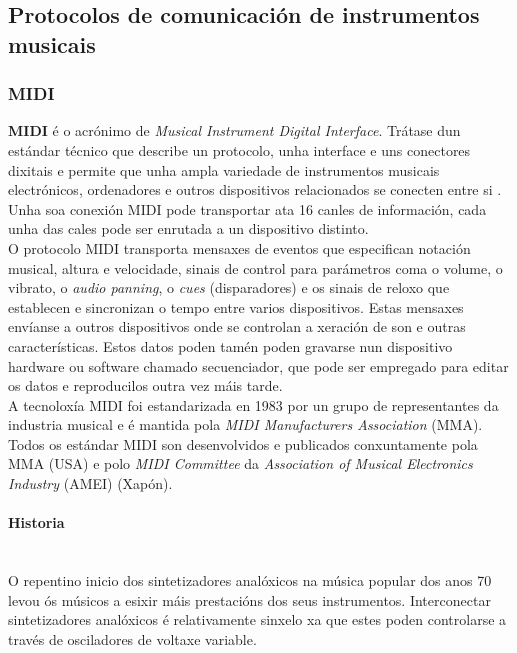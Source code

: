  \subsection{Protocolos de comunicación de instrumentos musicais}

  \subsubsection{MIDI}

  \textbf{MIDI} é o acrónimo de \textit{Musical Instrument Digital Interface}.
  Trátase dun estándar técnico que describe un protocolo, unha interface e uns
  conectores dixitais e permite que unha ampla variedade de instrumentos
  musicais electrónicos, ordenadores e outros dispositivos relacionados se
  conecten entre si \cite{WikipediaMIDI}. \\

  Unha soa conexión MIDI pode transportar ata 16 canles de información, cada
  unha das cales pode ser enrutada a un dispositivo distinto. \\

  O protocolo MIDI transporta mensaxes de eventos que especifican notación
  musical, altura e velocidade, sinais de control para parámetros coma o
  volume, o vibrato, o \textit{audio panning}, o \textit{cues} (disparadores) e
  os sinais de reloxo que establecen e sincronizan o tempo entre varios
  dispositivos. Estas mensaxes envíanse a outros dispositivos onde se controlan
  a xeración de son e outras características. Estos datos poden tamén poden
  gravarse nun dispositivo hardware ou software chamado secuenciador, que pode
  ser empregado para editar os datos e reproducilos outra vez máis tarde. \\

  A tecnoloxía MIDI foi estandarizada en 1983 por un grupo de representantes da
  industria musical e é mantida pola \textit{MIDI Manufacturers Association}
  (MMA). Todos os estándar MIDI son desenvolvidos e publicados conxuntamente
  pola MMA (USA) e polo \textit{MIDI Committee} da \textit{Association of
  Musical Electronics Industry} (AMEI) (Xapón).

   \paragraph{Historia}\mbox{}\\

   O repentino inicio dos sintetizadores analóxicos na música popular dos anos
   70 levou ós músicos a esixir máis prestacións dos seus instrumentos.
   Interconectar sintetizadores analóxicos é relativamente sinxelo xa que estes
   poden controlarse a través de osciladores de voltaxe variable. \\


